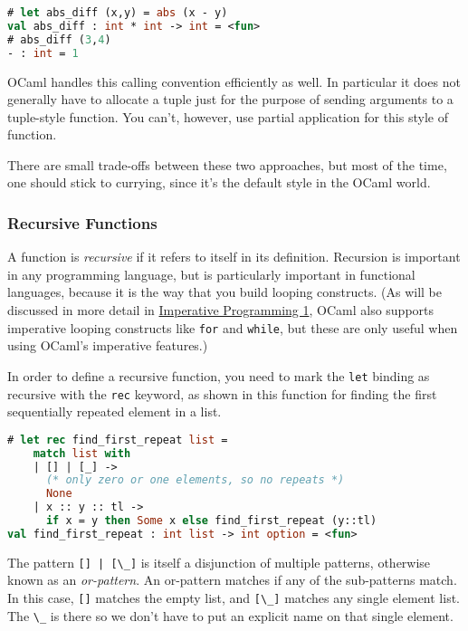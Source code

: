 \begin{lstlisting}[language=Caml]
# let abs_diff (x,y) = abs (x - y)
val abs_diff : int * int -> int = <fun>
# abs_diff (3,4)
- : int = 1
\end{lstlisting}

OCaml handles this calling convention efficiently as well. In particular
it does not generally have to allocate a tuple just for the purpose of
sending arguments to a tuple-style function. You can't, however, use
partial application for this style of function.

There are small trade-offs between these two approaches, but most of the
time, one should stick to currying, since it's the default style in the
OCaml world.

\hypertarget{recursive-functions}{%
\subsubsection{Recursive Functions}\label{recursive-functions}}

A function is \emph{recursive} if it refers to itself in its definition.
Recursion is important in any programming language, but is particularly
important in functional languages, because it is the way that you build
looping constructs. (As will be discussed in more detail in
\href{imperative-programming.html\#imperative-programming-1}{Imperative
Programming 1}, OCaml also supports imperative looping constructs like
\passthrough{\lstinline!for!} and \passthrough{\lstinline!while!}, but
these are only useful when using OCaml's imperative
features.)

In order to define a recursive function, you need to mark the
\passthrough{\lstinline!let!} binding as recursive with the
\passthrough{\lstinline!rec!} keyword, as shown in this function for
finding the first sequentially repeated element in a
list.

\begin{lstlisting}[language=Caml]
# let rec find_first_repeat list =
    match list with
    | [] | [_] ->
      (* only zero or one elements, so no repeats *)
      None
    | x :: y :: tl ->
      if x = y then Some x else find_first_repeat (y::tl)
val find_first_repeat : int list -> int option = <fun>
\end{lstlisting}

The pattern \passthrough{\lstinline![] | [\_]!} is itself a disjunction
of multiple patterns, otherwise known as an \emph{or-pattern}. An
or-pattern matches if any of the sub-patterns match. In this case,
\passthrough{\lstinline![]!} matches the empty list, and
\passthrough{\lstinline![\_]!} matches any single element list. The
\passthrough{\lstinline!\_!} is there so we don't have to put an
explicit name on that single element.

